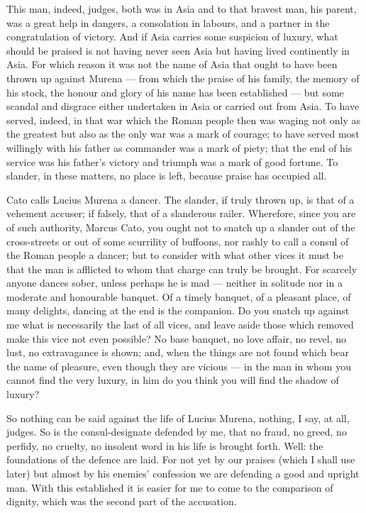  This man, indeed, judges, both was in Asia and to that bravest man, his parent, was a great help in dangers, a consolation in labours, and a partner in the congratulation of victory. And if Asia carries some suspicion of luxury, what should be praised is not having never seen Asia but having lived continently in Asia. For which reason it was not the name of Asia that ought to have been thrown up against Murena --- from which the praise of his family, the memory of his stock, the honour and glory of his name has been established --- but some scandal and disgrace either undertaken in Asia or carried out from Asia. To have served, indeed, in that war which the Roman people then was waging not only as the greatest but also as the only war was a mark of courage; to have served most willingly with his father as commander was a mark of piety; that the end of his service was his father's victory and triumph was a mark of good fortune. To slander, in these matters, no place is left, because praise has occupied all.

 Cato calls Lucius Murena a dancer. The slander, if truly thrown up, is that of a vehement accuser; if falsely, that of a slanderous railer. Wherefore, since you are of such authority, Marcus Cato, you ought not to snatch up a slander out of the cross-streets or out of some scurrility of buffoons, nor rashly to call a consul of the Roman people a dancer; but to consider with what other vices it must be that the man is afflicted to whom that charge can truly be brought. For scarcely anyone dances sober, unless perhaps he is mad --- neither in solitude nor in a moderate and honourable banquet. Of a timely banquet, of a pleasant place, of many delights, dancing at the end is the companion. Do you snatch up against me what is necessarily the last of all vices, and leave aside those which removed make this vice not even possible? No base banquet, no love affair, no revel, no lust, no extravagance is shown; and, when the things are not found which bear the name of pleasure, even though they are vicious --- in the man in whom you cannot find the very luxury, in him do you think you will find the shadow of luxury?

 So nothing can be said against the life of Lucius Murena, nothing, I say, at all, judges. So is the consul-designate defended by me, that no fraud, no greed, no perfidy, no cruelty, no insolent word in his life is brought forth. Well: the foundations of the defence are laid. For not yet by our praises (which I shall use later) but almost by his enemies' confession we are defending a good and upright man. With this established it is easier for me to come to the comparison of dignity, which was the second part of the accusation.

